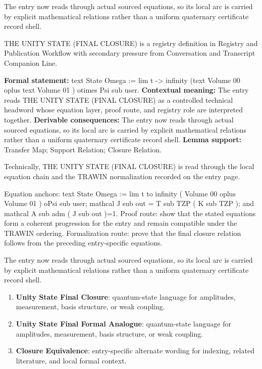 The entry now reads through actual sourced equations, so its local arc is carried by explicit mathematical relations rather than a uniform quaternary certificate record shell.
\clearpage


\begingroup\small
{}
THE UNITY STATE (FINAL CLOSURE) is a registry definition in Registry and Publication Workflow with secondary pressure from Conversation and Transcript Companion Line.

\begingroup\footnotesize\setlength{\emergencystretch}{3em}\sloppy
\textbf{Formal statement:} text State Omega := lim t -> infinity (text Volume 00 oplus text Volume 01 ) otimes Psi sub user. \textbf{Contextual meaning:} The entry reads THE UNITY STATE (FINAL CLOSURE) as a controlled technical headword whose equation layer, proof route, and registry role are interpreted together. \textbf{Derivable consequences:} The entry now reads through actual sourced equations, so its local arc is carried by explicit mathematical relations rather than a uniform quaternary certificate record shell. \textbf{Lemma support:} Transfer Map; Support Relation; Closure Relation.\par
\endgroup

Technically, THE UNITY STATE (FINAL CLOSURE) is read through the local equation chain and the TRAWIN normalization recorded on the entry page.

Equation anchors: text State Omega := lim t to infinity ( Volume 00 oplus Volume 01 ) oPsi sub user; mathcal J sub out = T sub TZP ( K sub TZP ); and mathcal A sub adm ( J sub out )=1. Proof route: show that the stated equations form a coherent progression for the entry and remain compatible under the TRAWIN ordering. Formalization route: prove that the final closure relation follows from the preceding entry-specific equations.

The entry now reads through actual sourced equations, so its local arc is carried by explicit mathematical relations rather than a uniform quaternary certificate record shell.
\endgroup

\begin{enumerate}[leftmargin=1.6em,itemsep=6pt,topsep=4pt]
\item \textbf{Unity State Final Closure}: quantum-state language for amplitudes, measurement, basis structure, or weak coupling.
\item \textbf{Unity State Final Formal Analogue}: quantum-state language for amplitudes, measurement, basis structure, or weak coupling.
\item \textbf{Closure Equivalence}: entry-specific alternate wording for indexing, related literature, and local formal context.
\end{enumerate}

